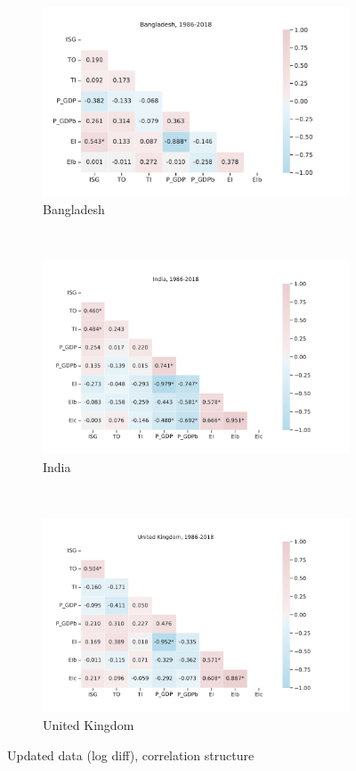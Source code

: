 \documentclass[11pt,a4paper]{article}
\begin{document}
\begin{figure}[htbp]
\centering
\begin{subfigure}{0.7\textwidth}
\includegraphics[width=\textwidth]{./plots/BGD_current_diff_correlations.pdf}
\caption{Bangladesh}
\end{subfigure}\\
\begin{subfigure}{0.7\textwidth}
\includegraphics[width=\textwidth]{./plots/IND_current_diff_correlations.pdf}
\caption{India}
\end{subfigure}\\
\begin{subfigure}{0.7\textwidth}
\includegraphics[width=\textwidth]{./plots/GBR_current_diff_correlations.pdf}
\caption{United Kingdom}
\end{subfigure}
\caption{Updated data (log diff), correlation structure}
\label{fig:logdiff_correlations}
\end{figure}
\end{document}
